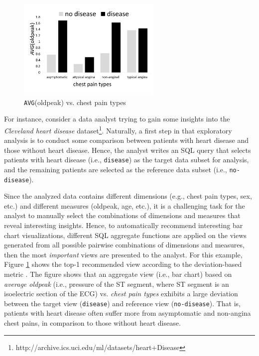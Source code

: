\begin{figure}
	\includegraphics[width=2.7in]{figures/introduction/cp_avg_oldpeak}
	\vspace{-8pt}
	\caption{{\tt AVG}(oldpeak) vs. chest pain types}
	\label{fig:intro1}
	\vspace{-8pt}
\end{figure}



For instance, consider a data analyst trying to gain some insights into the {\em Cleveland heart disease} dataset\footnote{http://archive.ics.uci.edu/ml/datasets/heart+Disease}. 
%
Naturally, a first step in that exploratory analysis is to conduct some comparison between patients with heart disease and those without heart disease.
%
Hence, the analyst writes an SQL query that selects patients with heart disease (i.e., {\tt disease}) as the target data subset for analysis, and the remaining patients are selected as the reference data subset (i.e., {\tt no-disease}).

Since the analyzed data contains different dimensions (e.g., chest pain types, sex, etc.) and different measures (oldpeak, age, etc.), it is a challenging task for the analyst to manually select the combinations of dimensions and measures that reveal interesting insights.
%
Hence, to automatically recommend interesting bar chart visualizations, different SQL aggregate functions are applied on the views generated from all possible pairwise combinations of dimensions and measures, then the most {\em important} views are presented to the analyst.
%
For this example, Figure \ref{fig:intro1} shows the top-1 recommended view according to the deviation-based metric \cite{Vartak2015, Vartak2014}. 
%
The figure shows that an aggregate view (i.e., bar chart) based on {\it average oldpeak} (i.e.,  pressure of the ST segment, where ST segment is an isoelectric section of the ECG) vs. {\it chest pain types} exhibits a large deviation between the target view ({\tt disease}) and reference view ({\tt no-disease}). 
%
That is, patients with heart disease often suffer more from asymptomatic and non-angina chest pains, in comparison to those without heart disease.  

